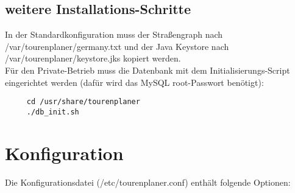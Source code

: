 \documentclass[ngerman,titlepage,parskip=true]{scrartcl}
\begin{document}
	\subsection{weitere Installations-Schritte}
	 In der Standardkonfiguration muss der Stra\ss{}engraph nach /var/tourenplaner/germany.txt und der Java Keystore nach /var/tourenplaner/keystore.jks kopiert werden.\\
	 F\"ur den Private-Betrieb muss die Datenbank mit dem Initialisierungs-Script eingerichtet werden (daf\"ur wird das MySQL root-Passwort ben\"otigt):
   \begin{lstlisting}
	 cd /usr/share/tourenplaner
	 ./db_init.sh
	\end{lstlisting}

\section{Konfiguration}
Die Konfigurationsdatei (/etc/tourenplaner.conf) enth\"alt folgende Optionen:
\end{document}
